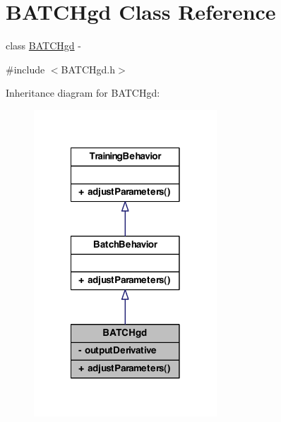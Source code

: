 \hypertarget{class_b_a_t_c_hgd}{
\section{BATCHgd Class Reference}
\label{class_b_a_t_c_hgd}
}


class \hyperlink{class_b_a_t_c_hgd}{BATCHgd} -\/  




{\ttfamily \#include $<$BATCHgd.h$>$}



Inheritance diagram for BATCHgd:\nopagebreak
\begin{figure}[H]
\begin{center}
\leavevmode
\includegraphics[width=194pt]{class_b_a_t_c_hgd__inherit__graph}
\end{center}
\end{figure}


